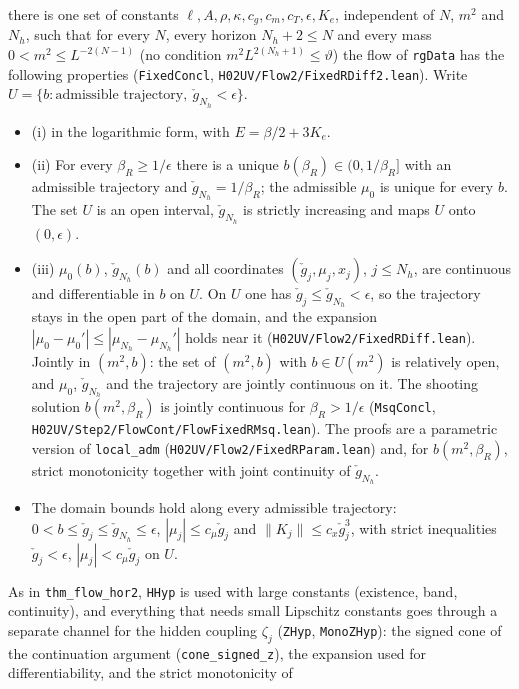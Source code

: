 \documentclass[11pt]{amsart}
\theoremstyle{definition}
\theoremstyle{remark}
\numberwithin{equation}{section}
\begin{document}
\begin{itemize}
there is one set of constants $\ell,A,\rho,\kappa,c_g,c_m,c_T,\epsilon,K_e$, independent of $N$, $m^2$
and $N_h$, such that for every $N$, every horizon $N_h+2\le N$ and every mass $0<m^2\le L^{-2(N-1)}$
(no condition $m^2L^{2(N_h+1)}\le\vartheta$) the flow of \texttt{rgData} has the following properties
(\texttt{FixedConcl}, \texttt{H02UV/Flow2/FixedRDiff2.lean}). Write $U=\{b:\text{admissible trajectory},\ \check g_{N_h}<\epsilon\}$.
  \begin{itemize}
  \item (i) in the logarithmic form, with $E=\beta/2+3K_e$.
  \item (ii) For every $\beta_R\ge1/\epsilon$ there is a unique $b(\beta_R)\in(0,1/\beta_R]$ with an admissible
    trajectory and $\check g_{N_h}=1/\beta_R$; the admissible $\mu_0$ is unique for every $b$. The set $U$ is an
    open interval, $\check g_{N_h}$ is strictly increasing and maps $U$ onto $(0,\epsilon)$.
  \item (iii) $\mu_0(b)$, $\check g_{N_h}(b)$ and all coordinates $(\check g_j,\mu_j,x_j)$, $j\le N_h$, are continuous
    and differentiable in $b$ on $U$. On $U$ one has $\check g_j\le\check g_{N_h}<\epsilon$, so the trajectory stays in
    the open part of the domain, and the expansion $|\mu_0-\mu_0'|\le|\mu_{N_h}-\mu_{N_h}'|$ holds near it
    (\texttt{H02UV/Flow2/FixedRDiff.lean}). Jointly in $(m^2,b)$: the set of $(m^2,b)$ with $b\in U(m^2)$ is relatively
    open, and $\mu_0$, $\check g_{N_h}$ and the trajectory are jointly continuous on it. The shooting solution
    $b(m^2,\beta_R)$ is jointly continuous for $\beta_R>1/\epsilon$ (\texttt{MsqConcl},
    \texttt{H02UV/Step2/FlowCont/FlowFixedRMsq.lean}). The proofs are a parametric version of \texttt{local\_adm}
    (\texttt{H02UV/Flow2/FixedRParam.lean}) and, for $b(m^2,\beta_R)$, strict monotonicity together with joint
    continuity of $\check g_{N_h}$.
  \item The domain bounds hold along every admissible trajectory: $0<b\le\check g_j\le\check g_{N_h}\le\epsilon$,
    $|\mu_j|\le c_\mu\check g_j$ and $\|K_j\|\le c_x\check g_j^3$, with strict inequalities $\check g_j<\epsilon$,
    $|\mu_j|<c_\mu\check g_j$ on $U$.
  \end{itemize}
  As in \texttt{thm\_flow\_hor2}, \texttt{HHyp} is used with large constants (existence, band, continuity), and
  everything that needs small Lipschitz constants goes through a separate channel for the hidden coupling
  $\zeta_j$ (\texttt{ZHyp}, \texttt{MonoZHyp}): the signed cone of the continuation argument
  (\texttt{cone\_signed\_z}), the expansion used for differentiability, and the strict monotonicity of

\end{itemize}
\end{document}
